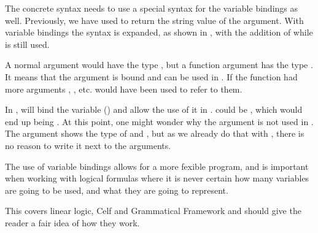 The concrete syntax needs to use a special syntax for the variable bindings as well. Previously, we have used  to return the string value of the argument. With variable bindings the syntax is expanded, as shown in , with the addition of  while  is still used.


A normal argument would have the type , but a function argument has the type . It means that the argument  is bound and can be used in . If the function had more arguments , , etc. would have been used to refer to them.

In ,  will bind the variable  () and allow the use of it in .  could be , which would end up being . At this point, one might wonder why the  argument is not used in . The  argument shows the type of  and , but as we already do that with , there is no reason to write it next to the arguments.

The use of variable bindings allows for a more fexible program, and is important when working with logical formulas where it is never certain how many variables are going to be used, and what they are going to represent.

This covers linear logic, Celf and Grammatical Framework and should give the reader a fair idea of how they work.